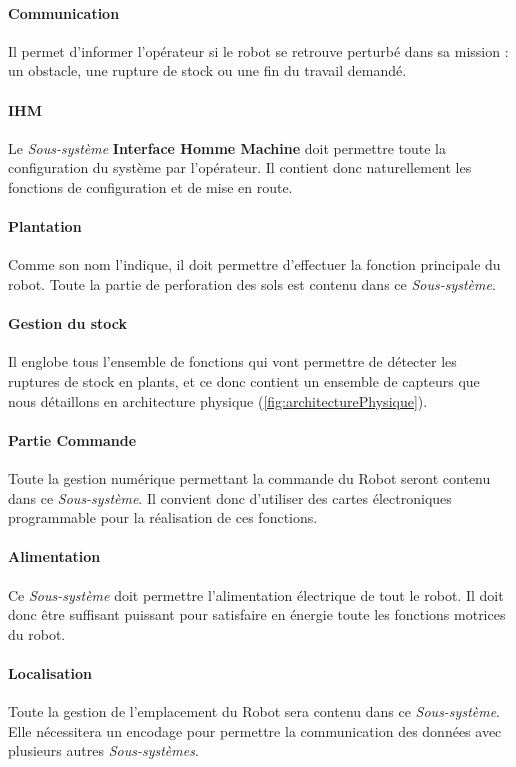 \paragraph*{Communication}
Il permet d'informer l'opérateur si le robot se retrouve perturbé dans sa mission : un obstacle, une rupture de stock ou une fin du travail demandé. 
\paragraph*{IHM}
Le \emph{Sous-système} \textbf{Interface Homme Machine} doit permettre toute la configuration du système par l'opérateur. Il contient donc naturellement les fonctions de configuration et de mise en route. 
\paragraph*{Plantation}
Comme son nom l'indique, il doit permettre d'effectuer la fonction principale du robot. Toute la partie de perforation des sols est contenu dans ce \emph{Sous-système}. 
\paragraph*{Gestion du stock}
Il englobe tous l'ensemble de fonctions qui vont permettre de détecter les ruptures de stock en plants, et ce donc contient un ensemble de capteurs que nous détaillons en architecture physique (\ref{fig:architecturePhysique}).  
\paragraph*{Partie Commande}
Toute la gestion numérique permettant la commande du Robot seront contenu dans ce \emph{Sous-système}. Il convient donc d'utiliser des cartes électroniques programmable pour la réalisation de ces fonctions.
\paragraph*{Alimentation}
Ce \emph{Sous-système} doit permettre l'alimentation électrique de tout le robot. Il doit donc être suffisant puissant pour satisfaire en énergie toute les fonctions motrices du robot.
\paragraph*{Localisation}
Toute la gestion de l'emplacement du Robot sera contenu dans ce \emph{Sous-système}. Elle nécessitera un encodage pour permettre la communication des données avec plusieurs autres \emph{Sous-systèmes}.
